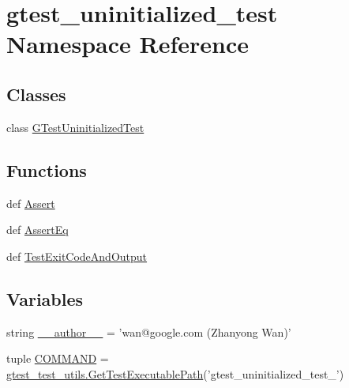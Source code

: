\hypertarget{namespacegtest__uninitialized__test}{\section{gtest\-\_\-uninitialized\-\_\-test Namespace Reference}
\label{namespacegtest__uninitialized__test}
}
\subsection*{Classes}
\begin{DoxyCompactItemize}
\item 
class \hyperlink{classgtest__uninitialized__test_1_1_g_test_uninitialized_test}{G\-Test\-Uninitialized\-Test}
\end{DoxyCompactItemize}
\subsection*{Functions}
\begin{DoxyCompactItemize}
\item 
def \hyperlink{namespacegtest__uninitialized__test_ab32cfcfbc956a0144af3195ea69705b1}{Assert}
\item 
def \hyperlink{namespacegtest__uninitialized__test_a146e8238c753828bcf35a9fcfd0dadf5}{Assert\-Eq}
\item 
def \hyperlink{namespacegtest__uninitialized__test_a32855a192af70f4ace8c07fee8d8a7ef}{Test\-Exit\-Code\-And\-Output}
\end{DoxyCompactItemize}
\subsection*{Variables}
\begin{DoxyCompactItemize}
\item 
string \hyperlink{namespacegtest__uninitialized__test_aaaf66027b4590f6f1da732c0b2716e10}{\-\_\-\-\_\-author\-\_\-\-\_\-} = 'wan@google.\-com (Zhanyong Wan)'
\item 
tuple \hyperlink{namespacegtest__uninitialized__test_a6341d3bb32a80c46bcca4fe5c72adf3f}{C\-O\-M\-M\-A\-N\-D} = \hyperlink{namespacegtest__test__utils_a1bdf3cac86afa675ed37629b183048e9}{gtest\-\_\-test\-\_\-utils.\-Get\-Test\-Executable\-Path}('gtest\-\_\-uninitialized\-\_\-test\-\_\-')
\end{DoxyCompactItemize}


